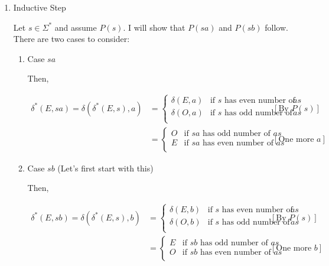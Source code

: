 \documentclass[12pt]{article}
\begin{document}
\begin{enumerate}[1.]
\begin{mdframed}
\begin{enumerate}[1.]
        \item Inductive Step

        \bigskip

        Let $s \in \Sigma^*$ and assume $P(s)$. I will show that $P(sa)$ and $P(sb)$
        follow. There are two cases to consider:

        \begin{enumerate}[1.]
            \item Case $sa$

            \bigskip

            Then,

            \begin{align}
            \delta^*(E,sa) = \delta(\delta^*(E,s),a) &= \begin{cases}
                \delta(E,a) & \text{if $s$ has even number of $as$}\\
                \delta(O,a) & \text{if $s$ has odd number of $as$}\\
            \end{cases} & [\text{By $P(s)$}]\\
            &= \begin{cases}
                O & \text{if $sa$ has odd number of $as$}\\
                E & \text{if $sa$ has even number of $as$}\\
            \end{cases} & [\text{One more $a$}]
            \end{align}

            \item Case $sb$ (Let's first start with this)

            \begin{mdframed}
            Then,

            \bigskip

            \begin{align}
            \delta^*(E,sb) = \delta(\delta^*(E,s),b) &= \begin{cases}
                \delta(E,b) & \text{if $s$ has even number of $as$}\\
                \delta(O,b) & \text{if $s$ has odd number of $as$}\\
            \end{cases} & [\text{By $P(s)$}]\\
            &= \begin{cases}
                E & \text{if $sb$ has odd number of $as$}\\
                O & \text{if $sb$ has even number of $as$}\\
            \end{cases} & [\text{One more $b$}]
            \end{align}


\end{mdframed}
\end{enumerate}
\end{enumerate}
\end{mdframed}
\end{enumerate}
\end{document}

